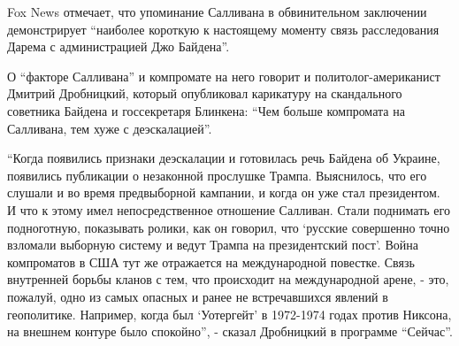 Fox News отмечает, что упоминание Салливана в обвинительном заключении
демонстрирует \enquote{наиболее короткую к настоящему моменту связь расследования
Дарема с администрацией Джо Байдена}.  

О \enquote{факторе Салливана} и компромате на него говорит и политолог-американист
Дмитрий Дробницкий, который опубликовал карикатуру на скандального советника
Байдена и госсекретаря Блинкена: \enquote{Чем больше компромата на Салливана, тем хуже
с деэскалацией}.


\enquote{Когда появились признаки деэскалации и готовилась речь Байдена об Украине,
появились публикации о незаконной прослушке Трампа. Выяснилось, что его слушали
и во время предвыборной кампании, и когда он уже стал президентом. И что к
этому имел непосредственное отношение Салливан. Стали поднимать его
подноготную, показывать ролики, как он говорил, что \enquote{русские совершенно точно
взломали выборную систему и ведут Трампа на президентский пост}. Война
компроматов в США тут же отражается на международной повестке. Связь внутренней
борьбы кланов с тем, что происходит на международной арене, - это, пожалуй,
одно из самых опасных и ранее не встречавшихся явлений в геополитике. Например,
когда был \enquote{Уотергейт} в 1972-1974 годах против Никсона, на внешнем контуре было
спокойно}, - сказал Дробницкий в программе \enquote{Сейчас}.
